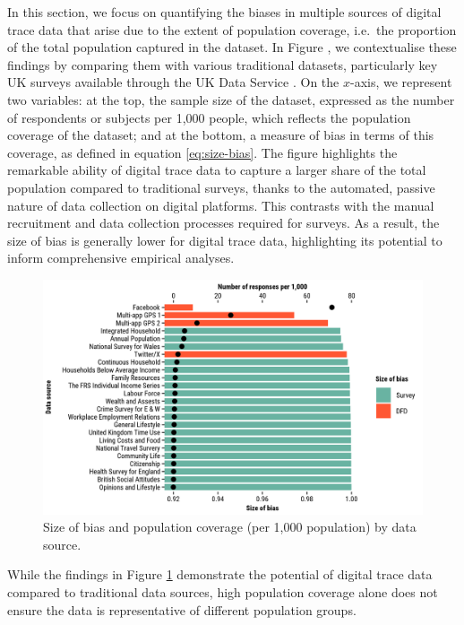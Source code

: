 \documentclass[]{rsos}%
\begin{document}
In this section, we focus on quantifying the biases in multiple sources
of digital trace data that arise due to the extent of population
coverage, i.e.~the proportion of the total population captured in the
dataset. In Figure , we contextualise these findings by comparing them
with various traditional datasets, particularly key UK surveys available
through the UK Data Service \citep{ukdataserviceSurveysData}. On the
\(x\)-axis, we represent two variables: at the top, the sample size of the
dataset, expressed as the number of respondents or subjects per 1,000
people, which reflects the population coverage of the dataset; and at
the bottom, a measure of bias in terms of this coverage, as defined in
equation \ref{eq:size-bias}. The figure highlights the remarkable
ability of digital trace data to capture a larger share of the total
population compared to traditional surveys, thanks to the automated,
passive nature of data collection on digital platforms. This contrasts
with the manual recruitment and data collection processes required for
surveys. As a result, the size of bias is generally lower for digital
trace data, highlighting its potential to inform comprehensive empirical
analyses.

\begin{figure}
\hypertarget{fig:survey}{%
\centering
\includegraphics{figures/compare-surveys-two-axis.png}
\caption{Size of bias and population coverage (per 1,000 population) by data
source.}\label{fig:survey}
}
\end{figure}

While the findings in Figure \ref{fig:survey} demonstrate the potential
of digital trace data compared to traditional data sources, high
population coverage alone does not ensure the data is representative of
different population groups.
\end{document}

